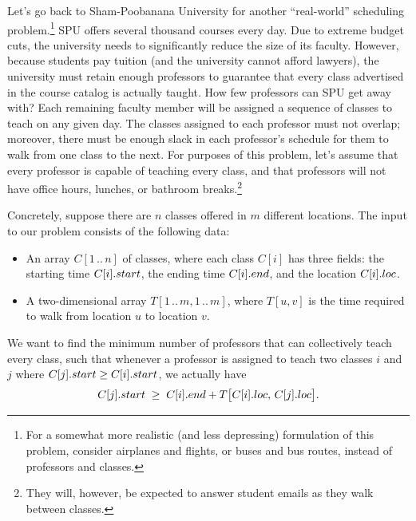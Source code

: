 Let’s go back to Sham-Poobanana University for another “real-world” scheduling problem.\footnote{For a somewhat more realistic (and less depressing) formulation of this problem, consider airplanes and flights, or buses and bus routes, instead of professors and classes.}
SPU offers several thousand courses every day.
Due to extreme budget cuts, the university needs to significantly reduce the size of its faculty.
However, because students pay tuition (and the university cannot afford lawyers), the university must retain enough professors to guarantee that every class advertised in the course catalog is actually taught.
How few professors can SPU get away with?
Each remaining faculty member will be assigned a sequence of classes to teach on any given day.
The classes assigned to each professor must not overlap; moreover, there must be enough slack in each professor’s schedule for them to walk from one class to the next.
For purposes of this problem, let’s assume that every professor is capable of teaching every class, and that professors will not have office hours, lunches, or bathroom breaks.\footnote{They will, however, be expected to answer student emails as they walk between classes.}

Concretely, suppose there are $n$ classes offered in $m$ different locations.
The input to our problem consists of the following data:
\begin{itemize}
\item An array $C[1\,..\,n]$ of classes, where each class $C[i]$ has three fields: the starting time $C[i].start$, the ending time $C[i].end$, and the location $C[i].loc$.
\item A two-dimensional array $T[1\,..\,m,1\,..\,m]$, where $T[u,v]$ is the time required to walk from location $u$ to location $v$.
\end{itemize}
\noindent We want to find the minimum number of professors that can collectively teach every class, such that whenever a professor is assigned to teach two classes $i$ and $j$ where $C[j].start \ge C[i].start$, we actually have
\[
C[j].start \;\ge\; C[i].end + T\bigl[C[i].loc,\, C[j].loc\bigr].
\]

